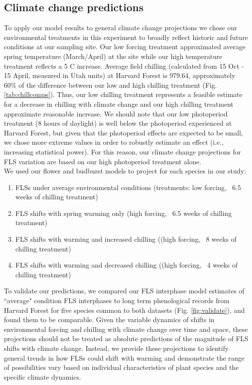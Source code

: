 \documentclass[11pt]{article}
\begin{document}
\subsection*{Climate change predictions}
\noindent To apply our model results to general climate change projections we chose our environmental treatments in this experiment to broadly reflect historic and future conditions at our sampling site. Our low forcing treatment approximated average spring temperature (March/April) at the site while our high temperature treatment reflects a 5 \degree C increase. Average field chilling (calculated from 15 Oct - 15 April, measured in Utah units) at Harvard Forest is 979.64, approximately 60\% of the difference between our low and high chilling treatment (Fig. \ref{tab:chillcomps}). Thus, our low chilling treatment represents a feasible estimate for a decrease in chilling with climate change and our high chilling treatment approximate reasonable increase. We should note that our low photoperiod treatment (8 hours of daylight) is well below the photoperiod experienced at Harvard Forest, but given that the photoperiod effects are expected to be small, we chose more extreme values in order to robustly estimate an effect (i.e., increasing statistical power). For this reason, our climate change projections for FLS variation are based on our high photoperiod treatment alone.\\

\noindent We used our flower and budburst models to project for each species in our study:\\
\begin{enumerate}
\item FLSs under average environmental conditions  (treatments: low forcing, ~6.5 weeks of chilling treatment)
\item FLS shifts with spring warming only (high forcing, ~6.5 weeks of chilling treatment)
\item FLS shifts with warming and increased chilling ((high forcing, ~8 weeks of chilling treatment)
\item FLS shifts with warming and decreased chilling ((high forcing, ~4 weeks of chilling treatment)

\end{enumerate}

\noindent To validate our predictions, we compared our FLS interphase model estimates of ``average" condition FLS interphases to long term phenological records from Harvard Forest \citep{OKeefe2015} for five species common to both datasets (Fig. \ref{fig:validate}), and found them to be comparable. Given the variable dynamics of shifts in environmental forcing and chilling with climate change over time and space, these projections should not be treated as absolute predictions of the magnitude of FLS shifts with climate change. Instead, we provide these projections to identify general trends in how FLSs could shift with warming and demonstrate the range of possibilities vary based on individual characteristics of plant species and the specific climate dynamics.\\
\end{document}
